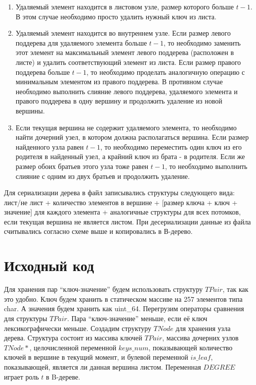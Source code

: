 \begin{enumerate} 
	\item Удаляемый элемент находится в листовом узле, размер которого больше $t - 1$. В этом случае необходимо просто 
	удалить нужный ключ из листа.
	\item Удаляемый элемент находится во внутреннем узле. Если размер левого поддерева для удаляемого элемента больше $t - 1$, 
	то необходимо заменить этот элемент на максимальный элемент левого поддерева (расположен в листе) и удалить соответствующий 
	элемент из листа. Если размер правого поддерева больше $t - 1$, то необходимо проделать аналогичную операцию с минимальным
	элементом из правого поддерева. В противном случае необходимо выполнить слияние левого поддерева, удаляемого элемента 
	и правого поддерева в одну вершину и продолжить удаление из новой вершины.
	\item Если текущая вершина не содержит удаляемого элемента, то необходимо найти дочерний узел, в котором должна располагаться 
	вершина. Если размер найденного узла равен $t - 1$, то необходимо переместить один ключ из его родителя в найденный узел, 
	а крайний ключ из брата - в родителя. Если же размер обоих братьев этого узла тоже равен $t - 1$, то необходимо выполнить 
	слияние с одним из двух братьев и продолжить удаление.
\end{enumerate}

Для сериализации дерева в файл записывались структуры следующего вида: лист/не лист + количество элементов в вершине + 
[размер ключа + ключ + значение] для каждого элемента + аналогичные структуры для всех потомков, если текущая вершина не является листом.
При десериализации данные из файла считывались согласно схеме выше и копировались в В-дерево.

\pagebreak

\section{Исходный код}

Для хранения пар \enquote{ключ-значение} будем использовать структуру $TPair$, так как это удобно. Ключ будем хранить
в статическом массиве на 257 элементов типа char. А значения будем хранить как uint\_64. 
Перегрузим операторы сравнения для структуры $TPair$. Пара \enquote{ключ-значение} меньше, если её ключ лексикографически меньше.
Создадим структуру $TNode$ для хранения узла дерева. Структура состоит из массива ключей $TPair$, массива дочерних узлов $TNode*$, целочисленной переменной $keys\_num$, показывающей количество ключей в вершине в текущий момент, и булевой переменной $is\_leaf$, 
показывающей, является ли данная вершина листом. Переменная $DEGREE$ играет роль $t$ в B-дереве.

